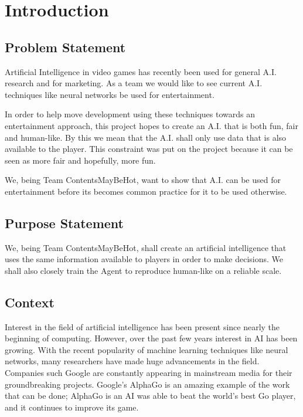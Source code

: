 \chapter{Introduction}


\section{Problem Statement}

Artificial Intelligence in video games has recently been used for general A.I. research and for marketing. As a team we would like to see current A.I. techniques like neural networks be used for entertainment.

In order to help move development using these techniques towards an entertainment approach, this project hopes to create an A.I. that is both fun, fair and human-like. By this we mean that the A.I. shall only use data that is also available to the player. This constraint was put on the project because it can be seen as more fair and hopefully, more fun.

We, being Team ContentsMayBeHot, want to show that A.I. can be used for entertainment before its becomes common practice for it to be used otherwise.



\section{Purpose Statement}

We, being Team ContentsMayBeHot, shall create an artificial intelligence that uses the same information available to players in order to make decisions. We shall also closely train the Agent to reproduce human-like on a reliable scale.





\section{Context}

Interest in the field of artificial intelligence has been present since nearly the beginning of computing. However, over the past few years interest in AI has been growing. With the recent popularity of machine learning techniques like neural networks, many researchers have made huge advancements in the field. Companies such Google are constantly appearing in mainstream media for their groundbreaking projects. Google's AlphaGo is an amazing example of the work that can be done; AlphaGo is an AI was able to beat the world's best Go player, and it continues to improve its game.


